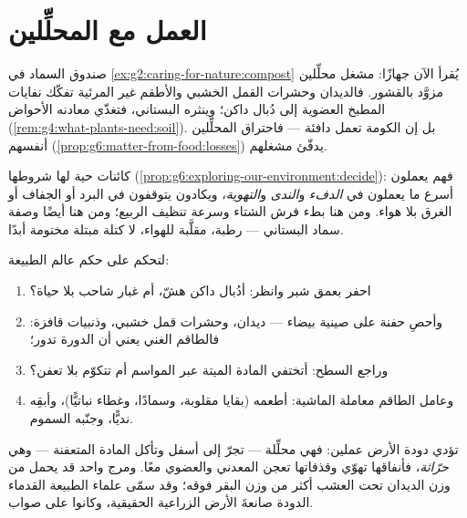\section{العمل مع المحلِّلين}

\begin{example}\label{ex:g6:decomposers-and-soil:compost}
صندوق السماد في \cref{ex:g2:caring-for-nature:compost} يُقرأ الآن
جهازًا: مشغل محلِّلين مزوَّد بالقشور. فالديدان وحشرات القمل الخشبي
والأطقم غير المرئية تفكّك نفايات المطبخ العضوية إلى دُبال داكن؛
وينثره البستاني، فتغذّي معادنه الأحواض
(\cref{rem:g4:what-plants-need:soil}). بل إن الكومة تعمل دافئة ---
فاحتراق المحلِّلين أنفسهم
(\cref{prop:g6:matter-from-food:losses}) يدفّئ مشغلهم.
\end{example}

\begin{proposition}\label{prop:g6:decomposers-and-soil:speed}
 كائنات حية لها شروطها
(\cref{prop:g6:exploring-our-environment:decide}): فهم يعملون أسرع
ما يعملون في \emph{الدفء} و\emph{الندى} و\emph{التهوية}، ويكادون
يتوقفون في البرد أو الجفاف أو الغرق بلا هواء. ومن هنا بطء فرش
الشتاء وسرعة تنظيف الربيع؛ ومن هنا أيضًا وصفة سماد البستاني ---
رطبة، مقلَّبة للهواء، لا كتلة مبتلة مختومة أبدًا.
\end{proposition}
\admitted

\begin{method}\label{met:g6:decomposers-and-soil:read}
لتحكم على  حكم عالم الطبيعة:
\begin{enumerate}
  \item احفر بعمق شبر وانظر: أدُبال داكن هشّ، أم غبار شاحب بلا
        حياة؟
  \item وأحصِ حفنة على صينية بيضاء --- ديدان، وحشرات قمل خشبي،
        وذنبيات قافزة: فالطاقم الغني يعني أن الدورة تدور؛
  \item وراجع السطح: أتختفي المادة الميتة عبر المواسم أم تتكوّم
        بلا تعفن؟
  \item وعامل الطاقم معاملة الماشية: أطعمه (بقايا مقلوبة، وسمادًا،
        وغطاء نباتيًّا)، وأبقِه نديًّا، وجنّبه السموم.
\end{enumerate}
\end{method}

\begin{example}\label{ex:g6:decomposers-and-soil:worm}
تؤدي دودة الأرض عملين: فهي محلِّلة --- تجرّ  إلى أسفل وتأكل
المادة المتعفنة --- وهي \emph{حرّاثة}، فأنفاقها تهوّي 
وقذفاتها تعجن المعدني والعضوي معًا. ومرج واحد قد يحمل من وزن
الديدان تحت العشب أكثر من وزن البقر فوقه؛ وقد سمّى علماء الطبيعة
القدماء الدودة صانعةَ الأرض الزراعية الحقيقية، وكانوا على صواب.
\end{example}

